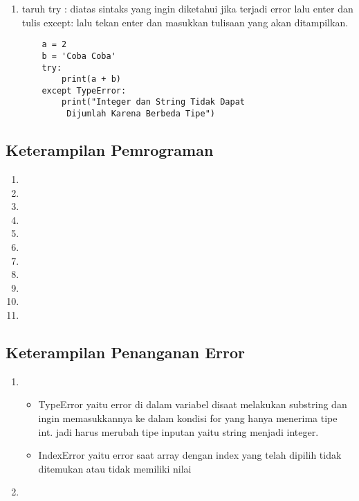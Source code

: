\begin{enumerate}
	\item taruh try : diatas sintaks yang ingin diketahui jika terjadi error lalu enter dan tulis except: lalu tekan enter 
dan masukkan tulisaan yang akan ditampilkan.
	\begin{verbatim}
	a = 2
	b = 'Coba Coba'
	try:
    	print(a + b)
	except TypeError:
    	print("Integer dan String Tidak Dapat
    	 Dijumlah Karena Berbeda Tipe")
	\end{verbatim}

\end{enumerate}
\subsection{Keterampilan Pemrograman}
\begin{enumerate}
	\item 

	\item 

	\item 

	\item 

	\item 

	\item 

	\item 

	\item 

	\item 

	\item 
	
	\item 
\end{enumerate}
\subsection{Keterampilan Penanganan Error}
\begin{enumerate}
	\item \begin{itemize} 
		\item TypeError yaitu error di dalam variabel disaat melakukan substring dan ingin memasukkannya ke dalam kondisi for 
	yang hanya menerima tipe int. jadi harus merubah tipe inputan yaitu string menjadi integer.
		\item IndexError yaitu error saat array dengan index yang telah dipilih tidak ditemukan atau tidak memiliki nilai
		\end{itemize}

	\item 
\end{enumerate}

